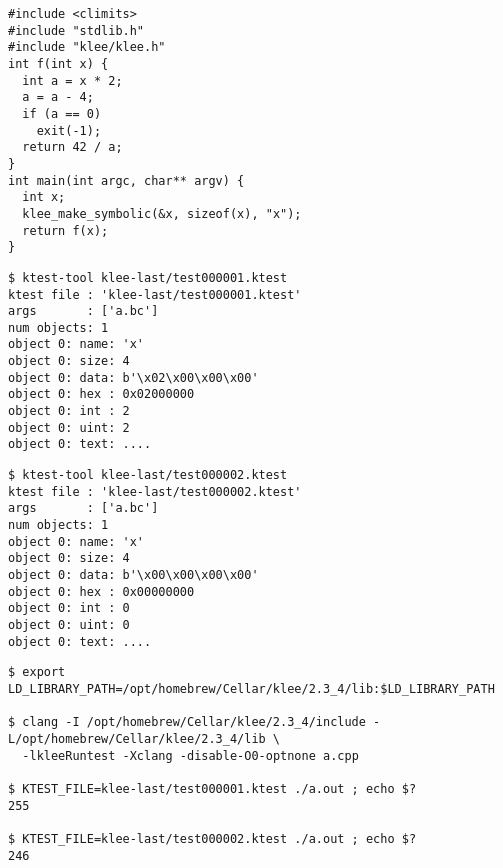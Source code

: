 \documentclass{article}
\begin{document}
\plush{}


\begin{pptWide}{3}
{\tiny\begin{verbatim}
#include <climits>
#include "stdlib.h"
#include "klee/klee.h"
int f(int x) {
  int a = x * 2;
  a = a - 4;
  if (a == 0)
    exit(-1);
  return 42 / a;
}
int main(int argc, char** argv) {
  int x;
  klee_make_symbolic(&x, sizeof(x), "x");
  return f(x);
}
\end{verbatim}
}
\par\columnbreak\par
{\tiny\begin{verbatim}
$ ktest-tool klee-last/test000001.ktest
ktest file : 'klee-last/test000001.ktest'
args       : ['a.bc']
num objects: 1
object 0: name: 'x'
object 0: size: 4
object 0: data: b'\x02\x00\x00\x00'
object 0: hex : 0x02000000
object 0: int : 2
object 0: uint: 2
object 0: text: ....
\end{verbatim}
}
\par\columnbreak\par
{\tiny\begin{verbatim}
$ ktest-tool klee-last/test000002.ktest
ktest file : 'klee-last/test000002.ktest'
args       : ['a.bc']
num objects: 1
object 0: name: 'x'
object 0: size: 4
object 0: data: b'\x00\x00\x00\x00'
object 0: hex : 0x00000000
object 0: int : 0
object 0: uint: 0
object 0: text: ....
\end{verbatim}
}
\end{pptWide}

\plush{}


{\scriptsize\begin{verbatim}
$ export LD_LIBRARY_PATH=/opt/homebrew/Cellar/klee/2.3_4/lib:$LD_LIBRARY_PATH

$ clang -I /opt/homebrew/Cellar/klee/2.3_4/include -L/opt/homebrew/Cellar/klee/2.3_4/lib \
  -lkleeRuntest -Xclang -disable-O0-optnone a.cpp

$ KTEST_FILE=klee-last/test000001.ktest ./a.out ; echo $?
255

$ KTEST_FILE=klee-last/test000002.ktest ./a.out ; echo $?
246
\end{verbatim}
}

\plush{}


\end{document}
